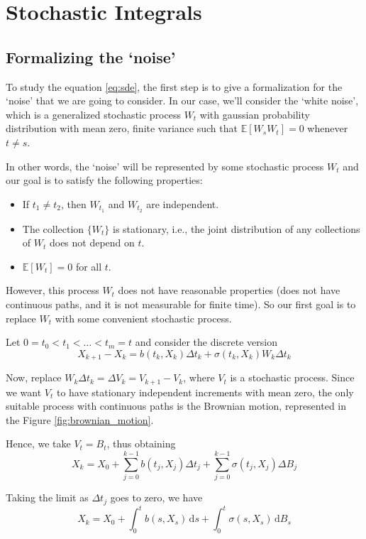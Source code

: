\chapter{Stochastic Integrals}

\section{Formalizing the `noise'}

To study the equation \eqref{eq:sde}, the first step is to give a formalization for the `noise' that we are going to consider. In our case, we'll consider the `white noise', which is a generalized stochastic process $W_t$ with gaussian probability distribution with mean zero, finite variance such that $\mathbb{E}[W_sW_t]=0$ whenever $t\neq s$.

In other words, the `noise' will be represented by some stochastic process $W_t$ and our goal is to satisfy the following properties:
\begin{itemize}
	\item If $t_1 \neq t_2$, then $W_{t_1}$ and $W_{t_2}$ are independent.
	\item The collection $\{W_t\}$ is stationary, i.e., the joint distribution of any collections of $W_t$ does not depend on $t$.
	\item $\mathbb{E}[W_t] = 0$ for all $t$.
\end{itemize}

However, this process $W_t$ does not have reasonable properties (does not have continuous paths, and it is not measurable for finite time). So our first goal is to replace $W_t$ with some convenient stochastic process.

Let $0 = t_0 < t_1 < \ldots < t_m = t$ and consider the discrete version
\[
	X_{k+1} - X_k = b(t_k,X_k)\Delta t_k + \sigma(t_k,X_k)W_k \Delta t_k
\]

Now, replace $W_k \Delta t_k = \Delta V_k = V_{k+1} - V_k$, where $V_t$ is a stochastic process. Since we want $V_t$ to have stationary independent increments with mean zero, the only suitable process with continuous paths is the Brownian motion, represented in the Figure \ref{fig:brownian_motion}.

Hence, we take $V_t = B_t$, thus obtaining
\[
	X_k = X_0 + \sum_{j=0}^{k-1} b(t_j, X_j) \Delta t_j + \sum_{j=0}^{k-1} \sigma(t_j, X_j) \Delta B_j
\]

Taking the limit as $\Delta t_j$ goes to zero, we have
\[
	X_k = X_0 + \int_0^t b(s, X_s) \, \mathrm{d}s + \int_0^t \sigma(s, X_s) \, \mathrm{d}B_s
\]

